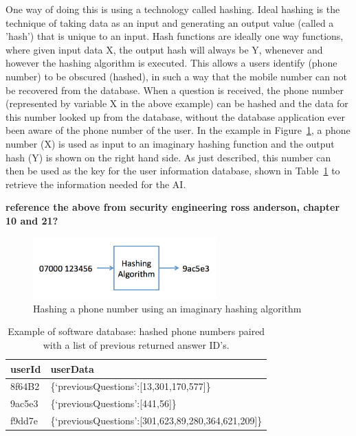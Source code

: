 \documentclass{article}
\begin{document}
One way of doing this is using a technology called hashing.  Ideal hashing is the technique of taking data as an input and generating an output value (called a 'hash') that is unique to an input.  Hash functions are ideally one way functions, where given input data X, the output hash will always be Y, whenever and however the hashing algorithm is executed.  This allows a users identify (phone number) to be obscured (hashed), in such a way that the mobile number can not be recovered from the database.  When a question is received, the phone number (represented by variable X in the above example) can be hashed and the data for this number looked up from the database, without the database application ever been aware of the phone number of the user.  In the example in Figure~\ref{fig:hashPhoneNumber}, a phone number (X) is used as input to an imaginary hashing function and the output hash (Y) is shown on the right hand side.  As just described, this number can then be used as the key for the user information database, shown in Table~\ref{table:hashDatabase} to retrieve the information needed for the AI.

{\bf reference the above from security engineering ross anderson, chapter 10 and 21?}

\begin{figure}[htb]
    \centering
    \includegraphics[width=200pt]{hashPhoneNumber}
    \caption{Hashing a phone number using an imaginary hashing algorithm}
    \label{fig:hashPhoneNumber}
\end{figure}

\begin{table}
\begin{center}
    \begin{tabular}{| l | l |}
    \hline
    userId & userData \\ \hline
    8f64B2 & \{‘previousQuestions’:[13,301,170,577]\} \\ \hline
    9ac5e3 & \{‘previousQuestions’:[441,56]\} \\ \hline
    f9dd7e & \{‘previousQuestions’:[301,623,89,280,364,621,209]\} \\
    \hline
    \end{tabular}
    \caption{Example of software database: hashed phone numbers paired with a list of previous returned answer ID's. }
    \label{table:hashDatabase}
\end{center}
\end{table}
\end{document}
